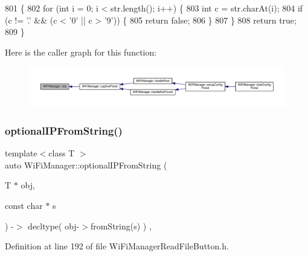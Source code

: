 \begin{DoxyCode}
801                                     \{
802   \textcolor{keywordflow}{for} (\textcolor{keywordtype}{int} i = 0; i < str.length(); i++) \{
803     \textcolor{keywordtype}{int} c = str.charAt(i);
804     \textcolor{keywordflow}{if} (c != \textcolor{charliteral}{'.'} && (c < '0' || c > \textcolor{charliteral}{'9'})) \{
805       \textcolor{keywordflow}{return} \textcolor{keyword}{false};
806     \}
807   \}
808   \textcolor{keywordflow}{return} \textcolor{keyword}{true};
809 \}
\end{DoxyCode}
Here is the caller graph for this function\+:\nopagebreak
\begin{figure}[H]
\begin{center}
\leavevmode
\includegraphics[width=350pt]{d4/dc8/class_wi_fi_manager_a9c78a8774f746ec22a99d03a53baa607_icgraph}
\end{center}
\end{figure}
\mbox{\label{class_wi_fi_manager_a6a94f08eb43e0871932556a4ccfa11b7}} 
\subsubsection{\texorpdfstring{optional\+I\+P\+From\+String()}{optionalIPFromString()}\hspace{0.1cm}{\footnotesize\ttfamily [1/2]}}
{\footnotesize\ttfamily template$<$class T $>$ \\
auto Wi\+Fi\+Manager\+::optional\+I\+P\+From\+String (\begin{DoxyParamCaption}\item[{T $\ast$}]{obj,  }\item[{const char $\ast$}]{s }\end{DoxyParamCaption}) -\/$>$ decltype(  obj-\/$>$from\+String(s)  ) \hspace{0.3cm}{\ttfamily [inline]}, {\ttfamily [private]}}



Definition at line 192 of file Wi\+Fi\+Manager\+Read\+File\+Button.\+h.


